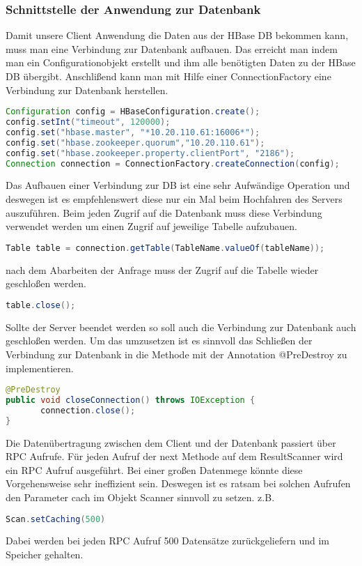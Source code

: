 \subsubsection{Schnittstelle der Anwendung zur Datenbank}\label{schnittstelle}

Damit unsere Client Anwendung die Daten aus der HBase DB bekommen kann, muss man eine Verbindung zur Datenbank aufbauen.
Das erreicht man indem man ein Configurationobjekt  erstellt und ihm alle benötigten Daten zu der HBase DB übergibt. Anschlißend kann man mit Hilfe einer ConnectionFactory eine Verbindung zur Datenbank herstellen.

\begin{lstlisting}[language=Java]
Configuration config = HBaseConfiguration.create();
config.setInt("timeout", 120000);
config.set("hbase.master", "*10.20.110.61:16006*");
config.set("hbase.zookeeper.quorum","10.20.110.61");
config.set("hbase.zookeeper.property.clientPort", "2186");
Connection connection = ConnectionFactory.createConnection(config);
\end{lstlisting}

Das Aufbauen einer Verbindung zur DB ist eine sehr Aufwändige Operation und deswegen ist es empfehlenswert diese nur ein Mal beim Hochfahren des Servers auszuführen.
Beim jeden Zugrif auf die Datenbank muss diese Verbindung verwendet werden um einen Zugrif auf jeweilige Tabelle aufzubauen.

\begin{lstlisting}[language=Java]
Table table = connection.getTable(TableName.valueOf(tableName));
\end{lstlisting}

nach dem Abarbeiten der Anfrage muss der Zugrif auf die Tabelle wieder geschloßen werden.
\begin{lstlisting}[language=Java]
table.close();
\end{lstlisting}

Sollte der Server beendet werden so soll auch die Verbindung zur Datenbank auch geschloßen werden.
Um das umzusetzen ist es sinnvoll das Schließen der Verbindung zur Datenbank in die Methode mit der Annotation     @PreDestroy zu implementieren.

\begin{lstlisting}[language=Java]
@PreDestroy
public void closeConnection() throws IOException {
       connection.close();
}
\end{lstlisting}

Die Datenübertragung zwischen dem Client und der Datenbank passiert über RPC Aufrufe. Für jeden Aufruf der next Methode auf dem ResultScanner wird ein RPC Aufruf ausgeführt. Bei einer großen Datenmege könnte diese Vorgehensweise sehr ineffizient sein. Deswegen ist es ratsam bei solchen Aufrufen den Parameter cach im Objekt Scanner sinnvoll zu setzen.
z.B.
\begin{lstlisting}[language=Java]
Scan.setCaching(500)
\end{lstlisting}
Dabei werden bei jeden RPC Aufruf 500 Datensätze zurückgeliefern und im Speicher gehalten.


